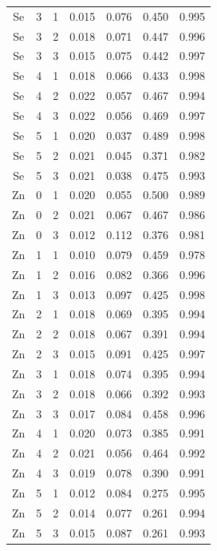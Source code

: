 \documentclass[ms, hidelinks]{uncgdissertationexp3}
\theoremstyle{plain}
\theoremstyle{definition}
\theoremstyle{remark}
\begin{document}
\begin{longtable}{ccccccc}
  Se & 3 & 1 & 0.015 & 0.076 & 0.450 & 0.995\\
  \rowcolor{gray!6}  Se & 3 & 2 & 0.018 & 0.071 & 0.447 & 0.996\\
  Se & 3 & 3 & 0.015 & 0.075 & 0.442 & 0.997\\
  \rowcolor{gray!6}  Se & 4 & 1 & 0.018 & 0.066 & 0.433 & 0.998\\
  Se & 4 & 2 & 0.022 & 0.057 & 0.467 & 0.994\\
  \rowcolor{gray!6}  Se & 4 & 3 & 0.022 & 0.056 & 0.469 & 0.997\\
  Se & 5 & 1 & 0.020 & 0.037 & 0.489 & 0.998\\
  \rowcolor{gray!6}  Se & 5 & 2 & 0.021 & 0.045 & 0.371 & 0.982\\
  Se & 5 & 3 & 0.021 & 0.038 & 0.475 & 0.993\\
  \rowcolor{gray!6}  Zn & 0 & 1 & 0.020 & 0.055 & 0.500 & 0.989\\
  Zn & 0 & 2 & 0.021 & 0.067 & 0.467 & 0.986\\
  \rowcolor{gray!6}  Zn & 0 & 3 & 0.012 & 0.112 & 0.376 & 0.981\\
  Zn & 1 & 1 & 0.010 & 0.079 & 0.459 & 0.978\\
  \rowcolor{gray!6}  Zn & 1 & 2 & 0.016 & 0.082 & 0.366 & 0.996\\
  Zn & 1 & 3 & 0.013 & 0.097 & 0.425 & 0.998\\
  \rowcolor{gray!6}  Zn & 2 & 1 & 0.018 & 0.069 & 0.395 & 0.994\\
  Zn & 2 & 2 & 0.018 & 0.067 & 0.391 & 0.994\\
  \rowcolor{gray!6}  Zn & 2 & 3 & 0.015 & 0.091 & 0.425 & 0.997\\
  Zn & 3 & 1 & 0.018 & 0.074 & 0.395 & 0.994\\
  \rowcolor{gray!6}  Zn & 3 & 2 & 0.018 & 0.066 & 0.392 & 0.993\\
  Zn & 3 & 3 & 0.017 & 0.084 & 0.458 & 0.996\\
  \rowcolor{gray!6}  Zn & 4 & 1 & 0.020 & 0.073 & 0.385 & 0.991\\
  Zn & 4 & 2 & 0.021 & 0.056 & 0.464 & 0.992\\
  \rowcolor{gray!6}  Zn & 4 & 3 & 0.019 & 0.078 & 0.390 & 0.991\\
  Zn & 5 & 1 & 0.012 & 0.084 & 0.275 & 0.995\\
  \rowcolor{gray!6}  Zn & 5 & 2 & 0.014 & 0.077 & 0.261 & 0.994\\
  Zn & 5 & 3 & 0.015 & 0.087 & 0.261 & 0.993\\*
  \end{longtable}
\end{document}
